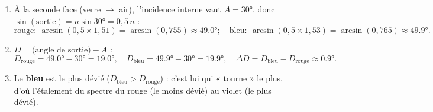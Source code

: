 \documentclass[11pt,a4paper]{article}
\begin{document}
\begin{corrige}
\begin{enumerate}[label=\alph*)]
  \item À la seconde face (verre $\to$ air), l'incidence interne vaut $A=\ang{30}$, donc
        $\sin(\text{sortie})=n\sin\ang{30}=0{,}5\,n$ :
        \[ \text{rouge}:\ \arcsin(0{,}5\times1{,}51)=\arcsin(0{,}755)\approx\ang{49.0} ;\quad
           \text{bleu}:\ \arcsin(0{,}5\times1{,}53)=\arcsin(0{,}765)\approx\ang{49.9}. \]
  \item $D=\text{(angle de sortie)}-A$ :
        \[ D_{\text{rouge}}=\ang{49.0}-\ang{30}=\ang{19.0},\quad
           D_{\text{bleu}}=\ang{49.9}-\ang{30}=\ang{19.9},\quad
           \Delta D=D_{\text{bleu}}-D_{\text{rouge}}\approx\ang{0.9}. \]
  \item Le \textbf{bleu} est le plus dévié ($D_{\text{bleu}}>D_{\text{rouge}}$) : c'est lui qui « tourne »
        le plus, d'où l'étalement du spectre du rouge (le moins dévié) au violet (le plus dévié).
\end{enumerate}
\end{corrige}
\end{document}
